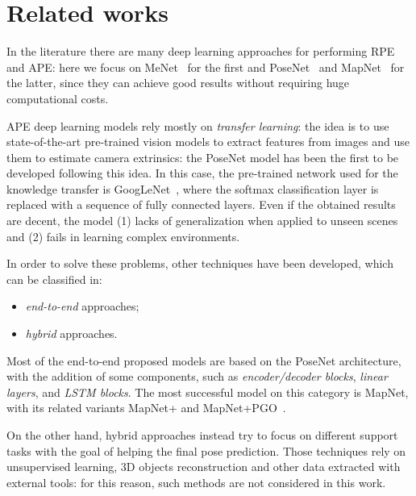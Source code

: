 \section{Related works}
In the literature there are many deep learning approaches for performing RPE and APE: here we focus on MeNet~\cite{menet} for the first and PoseNet~\cite{9348762} and MapNet~\cite{mapnet} for the latter, since they can achieve good results without requiring huge computational costs.

APE deep learning models rely mostly on \emph{transfer learning}: the idea is to use state-of-the-art pre-trained vision models to extract features from images and use them to estimate camera extrinsics: the PoseNet model has been the first to be developed following this idea. In this case, the pre-trained network used for the knowledge transfer is GoogLeNet~\cite{googlenet}, where the softmax classification layer is replaced with a sequence of fully connected layers. Even if the obtained results are decent, the model (1) lacks of generalization when applied to unseen scenes and (2) fails in learning complex environments.

In order to solve these problems, other techniques have been developed, which can be classified in:
\begin{itemize}
    \item \emph{end-to-end} approaches;
    \item \emph{hybrid} approaches.
\end{itemize}

Most of the end-to-end proposed models are based on the PoseNet architecture, with the addition of some components, such as \emph{encoder/decoder blocks}, \emph{linear layers}, and \emph{LSTM blocks}. The most successful model on this category is MapNet, with its related variants MapNet+ and MapNet+PGO~\cite{mapnet}.

On the other hand, hybrid approaches instead try to focus on different support tasks with the goal of helping the final pose prediction. Those techniques rely on unsupervised learning, 3D objects reconstruction and other data extracted with external tools: for this reason, such methods are not considered in this work.
